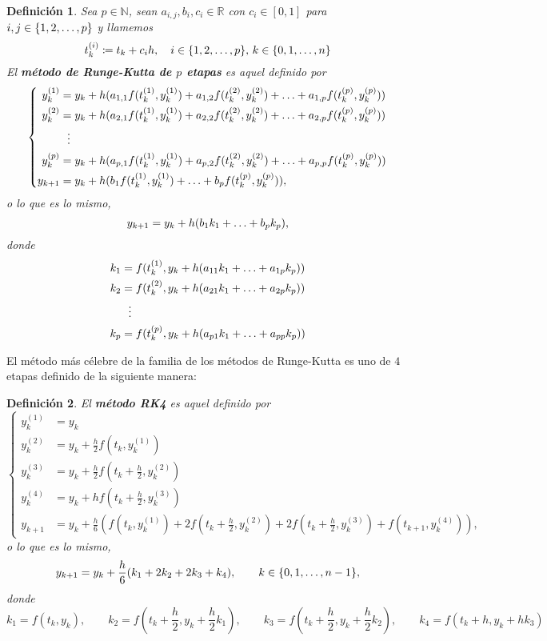 \documentclass[11pt]{report}
\theoremstyle{mytheorem}
\theoremstyle{mydefinition}
\newtheorem{definition}{Definición}
\theoremstyle{myexample}
\newenvironment{cdefinition} %
  {\begin{mdframed}[
        linewidth=3pt,
        linecolor=c1,
        bottomline=false,
        topline=false,
        rightline=false,
        innerrightmargin=0pt,
        innertopmargin=0pt,
        innerbottommargin=0pt,
        innerleftmargin=1em, %
        skipabove=\baselineskip]
    \begin{definition}}
  {\end{definition}\end{mdframed}}
\newcommand{\R}{\mathbb R}
\newcommand{\N}{\mathbb N}
\newcommand{\mybf}[1]{\boldmath\textbf{\color{c1}#1}\unboldmath}
\begin{document}
\begin{cdefinition}
Sea $p \in \N$, sean $a_{i,j},b_i,c_i \in \R$ con $c_i \in [0,1]$ para $i,j \in \{1,2,\mathellipsis,p\}$ y llamemos
\[t_k^{(i)} \coloneqq t_k+c_ih, \quad i \in \{1,2,\mathellipsis,p\}, \, k \in \{0,1,\mathellipsis,n\}\]
El \mybf{método de Runge-Kutta de $p$ etapas} es aquel definido por
\[\left\{\begin{alignedat}{1}
    y_k^{(1)} &= y_k+h(a_{1,1}f(t_k^{(1)},y_k^{(1)})+a_{1,2}f(t_k^{(2)},y_k^{(2)})+\mathellipsis+a_{1,p}f(t_k^{(p)},y_k^{(p)})) \\
    y_k^{(2)} &= y_k+h(a_{2,1}f(t_k^{(1)},y_k^{(1)})+a_{2,2}f(t_k^{(2)},y_k^{(2)})+\mathellipsis+a_{2,p}f(t_k^{(p)},y_k^{(p)})) \\
    &\phantom{\vdots} \: \vdots \\
    y_k^{(p)} &= y_k+h(a_{p,1}f(t_k^{(1)},y_k^{(1)})+a_{p,2}f(t_k^{(2)},y_k^{(2)})+\mathellipsis+a_{p,p}f(t_k^{(p)},y_k^{(p)})) \\
    y_{k+1} &= y_k+h(b_1f(t_k^{(1)},y_k^{(1)})+\mathellipsis+b_pf(t_k^{(p)},y_k^{(p)})),
\end{alignedat}\right.\]
o lo que es lo mismo,
\[y_{k+1}=y_k+h(b_1k_1+\mathellipsis+b_pk_p),\]
donde
\[\begin{aligned}[t]
    k_1 &= f(t_k^{(1)},y_k+h(a_{11}k_1+\mathellipsis+a_{1p}k_p)) \\
    k_2 &= f(t_k^{(2)},y_k+h(a_{21}k_1+\mathellipsis+a_{2p}k_p)) \\
    &\phantom{\vdots} \: \vdots \\
    k_p &= f(t_k^{(p)},y_k+h(a_{p1}k_1+\mathellipsis+a_{pp}k_p))
\end{aligned}\]
\end{cdefinition}

El método más célebre de la familia de los métodos de Runge-Kutta es uno de $4$ etapas definido de la siguiente manera:

\begin{cdefinition}
El \mybf{método RK4} es aquel definido por
\[\left\{\begin{alignedat}{1}
    y_k^{(1)} &= y_k\\
    y_k^{(2)} &= y_k+\frac{h}{2}f(t_k,y_k^{(1)}) \\
    y_k^{(3)} &= y_k+\frac{h}{2}f(t_k+\frac{h}{2},y_k^{(2)}) \\
    y_k^{(4)} &= y_k+hf(t_k+\frac{h}{2},y_k^{(3)})\\
    y_{k+1} &= y_k+\frac{h}{6}(f(t_k,y_k^{(1)})+2f(t_k+\frac{h}{2},y_k^{(2)})+2f(t_k+\frac{h}{2},y_k^{(3)})+f(t_{k+1},y_k^{(4)})),
\end{alignedat}\right.\]
o lo que es lo  mismo,
\[
    \displaystyle y_{k+1}=y_k+\frac{h}{6}(k_1+2k_2+2k_3+k_4), \qquad k \in \{0,1,\mathellipsis,n-1\},
\]
donde
\[k_1 = f(t_k,y_k), \qquad k_2 = f(t_k+\frac{h}{2},y_k+\frac{h}{2}k_1), \qquad k_3 = f(t_k+\frac{h}{2},y_k+\frac{h}{2}k_2), \qquad k_4 = f(t_k+h,y_k+hk_3)\]
\end{cdefinition}
\end{document}
